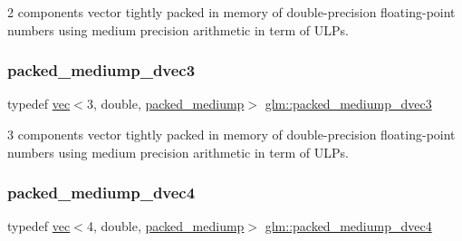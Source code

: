2 components vector tightly packed in memory of double-\/precision floating-\/point numbers using medium precision arithmetic in term of U\+L\+Ps. 

\mbox{\label{group__gtc__type__aligned_ga0c34c771e940f66eccff81d402f83cdd}} 
\subsubsection{\texorpdfstring{packed\+\_\+mediump\+\_\+dvec3}{packed\_mediump\_dvec3}}
{\footnotesize\ttfamily typedef \mbox{\hyperlink{structglm_1_1vec}{vec}}$<$3, double, \mbox{\hyperlink{namespaceglm_a36ed105b07c7746804d7fdc7cc90ff25a9604654c3b137cd7898689fd34b25bc0}{packed\+\_\+mediump}}$>$ \mbox{\hyperlink{group__gtc__type__aligned_ga0c34c771e940f66eccff81d402f83cdd}{glm\+::packed\+\_\+mediump\+\_\+dvec3}}}



3 components vector tightly packed in memory of double-\/precision floating-\/point numbers using medium precision arithmetic in term of U\+L\+Ps. 

\mbox{\label{group__gtc__type__aligned_gaa88ce743e1248a4e822e591e6bdf071b}} 
\subsubsection{\texorpdfstring{packed\+\_\+mediump\+\_\+dvec4}{packed\_mediump\_dvec4}}
{\footnotesize\ttfamily typedef \mbox{\hyperlink{structglm_1_1vec}{vec}}$<$4, double, \mbox{\hyperlink{namespaceglm_a36ed105b07c7746804d7fdc7cc90ff25a9604654c3b137cd7898689fd34b25bc0}{packed\+\_\+mediump}}$>$ \mbox{\hyperlink{group__gtc__type__aligned_gaa88ce743e1248a4e822e591e6bdf071b}{glm\+::packed\+\_\+mediump\+\_\+dvec4}}}



